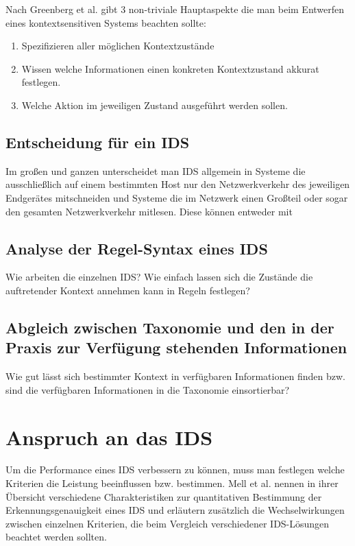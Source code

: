  Nach Greenberg et al. \cite{greenberg2001context} gibt 3 non-triviale Hauptaspekte die man beim Entwerfen eines kontextsensitiven Systems beachten sollte: 
\begin{enumerate}
\item{Spezifizieren aller möglichen Kontextzustände}
\item{Wissen welche Informationen einen konkreten Kontextzustand akkurat festlegen.}
\item{Welche Aktion im jeweiligen Zustand ausgeführt werden sollen.}
\end{enumerate}

\subsection{Entscheidung für ein IDS}
Im großen und ganzen unterscheidet man IDS allgemein in Systeme die ausschließlich auf einem bestimmten Host nur den Netzwerkverkehr des jeweiligen Endgerätes mitschneiden und Systeme die im Netzwerk einen Großteil oder sogar den gesamten Netzwerkverkehr mitlesen. Diese können entweder mit 
\subsection{Analyse der Regel-Syntax eines IDS}
Wie arbeiten die einzelnen IDS? Wie einfach lassen sich die Zustände die auftretender Kontext annehmen kann in Regeln festlegen?
\subsection{ Abgleich zwischen Taxonomie und den in der Praxis zur Verfügung stehenden Informationen}
Wie gut lässt sich bestimmter Kontext in verfügbaren Informationen finden bzw. sind die verfügbaren Informationen in die Taxonomie einsortierbar?
\section{Anspruch an das IDS}
Um die Performance eines IDS verbessern zu können, muss man festlegen welche Kriterien die Leistung beeinflussen bzw. bestimmen.
Mell et al.\cite{mell2003overview} nennen in ihrer Übersicht verschiedene Charakteristiken zur quantitativen Bestimmung der Erkennungsgenauigkeit eines IDS und erläutern zusätzlich die Wechselwirkungen zwischen einzelnen Kriterien, die beim Vergleich verschiedener IDS-Lösungen beachtet werden sollten.
